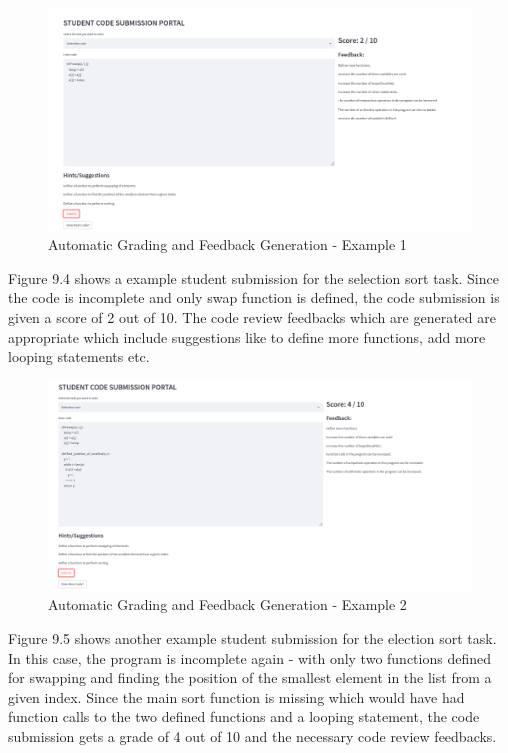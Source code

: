 \begin{figure}[H]
\centering
\includegraphics[scale=0.53,frame]{./figures/dep4.png}
\caption{Automatic Grading and Feedback Generation - Example 1}
\label{fig3}
\end{figure}

Figure 9.4 shows a example student submission for the selection sort task. Since the code is incomplete and only swap function is defined, the code submission is given a score of 2 out of 10. The code review feedbacks which are generated are appropriate which include suggestions like to define more functions, add more looping statements etc.

\newpage

\begin{figure}[H]
\centering
\includegraphics[scale=0.51,frame]{./figures/dep5.png}
\caption{Automatic Grading and Feedback Generation - Example 2}
\label{fig4}
\end{figure}

Figure 9.5 shows another example student submission for the election sort task. In this case, the program is incomplete again - with only two functions defined for swapping and finding the position of the smallest element in the list from a given index. Since the main sort function is missing which would have had function calls to the two defined functions and a looping statement, the code submission gets a grade of 4 out of 10 and the necessary code review feedbacks.


